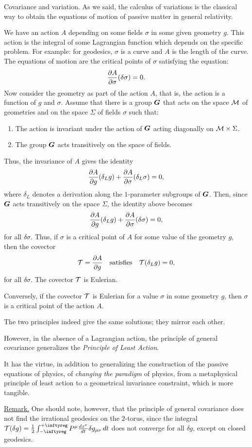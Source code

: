 \begin{Article}{Covariance and variation.}{}
  As we said,
  the calculus of variations is the classical way to obtain the equations of motion of passive matter in general relativity.
  
  We have an action $A$ depending on some fields $\sigma$ in some given geometry $g$.
  This action is the integral of some Lagrangian function which depends on the specific problem.
  For example: for geodesics, $\sigma$ is a curve and $A$ is the length of the curve.
  The equations of motion are the critical points of $\sigma$ satisfying the equation:
  $$
    {\partial A \over \partial \sigma}(\delta \sigma) = 0.
  $$
  Now consider the geometry as part of the action $A$,
  that is,
  the action is a function of $g$ and $\sigma$.
  Assume that there is a group ${\mbox{\boldmath $G$}}$ that acts on the space $\mathcal{M}$ of geometries and on the space $\Sigma$ of fields $\sigma$ such that:
  \begin{enumerate}
    \item The action is invariant under the action of ${\mbox{\boldmath $G$}}$ acting diagonally on $\mathcal{M} \times \Sigma$.
    \item The group ${\mbox{\boldmath $G$}}$ acts transitively on the space of fields.
  \end{enumerate}
  Thus,
  the invariance of $A$ gives the identity
  $$
    {\partial A \over \partial g}(\delta_L g) + {\partial A \over \partial \sigma}(\delta_L \sigma) = 0,
  $$
  where $\delta_L$ denotes a derivation along the $1$-parameter subgroups of ${\mbox{\boldmath $G$}}$.
  Then,
  since ${\mbox{\boldmath $G$}}$ acts transitively on the space $\Sigma$,
  the identity above becomes
  $$
    {\partial A \over \partial g}(\delta_L g) + {\partial A \over \partial \sigma}(\delta \sigma) = 0,
  $$
  for all $\delta \sigma$.
  Thus,
  if $\sigma$ is a critical point of $A$ for some value of the geometry $g$,
  then the covector
  $$
    \mathcal{T} = {\partial A \over \partial g}
    \quad \text{satisfies} \quad
    \mathcal{T}(\delta_L g) = 0,
  $$
  for all $\delta \sigma$.
  The covector $\mathcal{T}$ is Eulerian.
  
  Conversely,
  if the covector $\mathcal{T}$ is Eulerian for a value $\sigma$ in some geometry $g$,
  then $\sigma$ is a critical point of the action $A$.
  
  The two principles indeed give the same solutions;
  they mirror each other.
  
  However,
  in the absence of a Lagrangian action,
  the principle of general covariance generalizes the \emph{Principle of Least Action}.
  
  It has the virtue,
  in addition to generalizing the construction of the passive equations of physics,
  of \emph{changing the paradigm} of physics,
  from a metaphysical principle of least action to a geometrical invariance constraint,
  which is more tangible.
  
  \uline{Remark.} One should note, however, that the principle of general covariance does not find the irrational geodesics on the $2$-torus,
  since the integral $\cT(\delta g) = {1 \over 2} \int_{-\infty}^{+\infty} P^\mu {dx^\nu \over dt} \delta g_{\mu\nu} \, dt$ does not converge for all $\delta g$,
  except on closed geodesics.
\end{Article}


